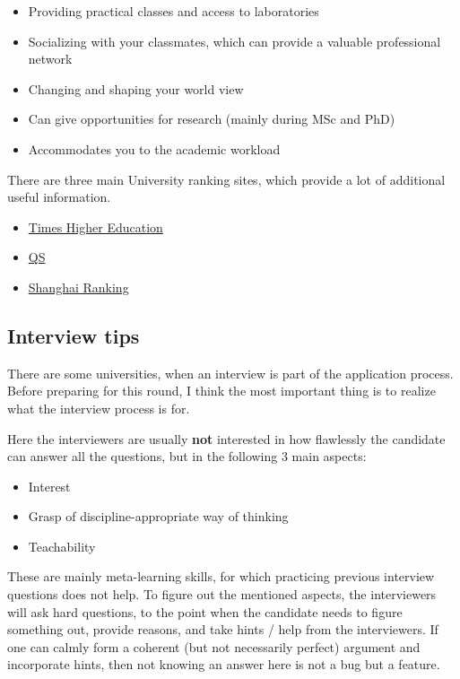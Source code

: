 \documentclass{article}
\begin{document}
\begin{itemize}
    \item Providing practical classes and access to laboratories
    \item Socializing with your classmates, which can provide a valuable professional network
    \item Changing and shaping your world view
    \item Can give opportunities for research (mainly during MSc and PhD)
    \item Accommodates you to the academic workload
\end{itemize}

There are three main University ranking sites, which provide a lot of additional useful information.
\begin{itemize}
\item \href{https://www.timeshighereducation.com/world-university-rankings/2020/world-ranking}{Times Higher Education}
\item \href{https://www.topuniversities.com/university-rankings/world-university-rankings/2020}{QS}
\item \href{http://www.shanghairanking.com/}{Shanghai Ranking}
\end{itemize}

\subsection{Interview tips}

There are some universities, when an interview is part of the application process. Before preparing for this round, I think the most important thing is to realize what the interview process is for.

Here the interviewers are usually {\bf not} interested in how flawlessly the candidate can answer all the questions, but in the following 3 main aspects:

\begin{itemize}
    \item Interest
    \item Grasp of discipline-appropriate way of thinking
    \item Teachability
\end{itemize}

These are mainly meta-learning skills, for which practicing previous interview questions does not help. To figure out the mentioned aspects, the interviewers will ask hard questions, to the point when the candidate needs to figure something out, provide reasons, and take hints / help from the interviewers. If one can calmly form a coherent (but not necessarily perfect) argument and incorporate hints, then not knowing an answer here is not a bug but a feature.
\end{document}
